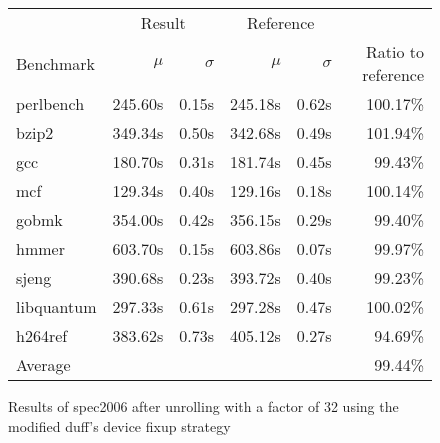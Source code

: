 \begin{figure}[h]
    \begin{center}
        \begin{tabular}{lrrrrr}
            \toprule
            & \multicolumn{2}{c}{Result} & \multicolumn{2}{c}{Reference}\\
            Benchmark & $\mu$ & $\sigma$ & $\mu$ & $\sigma$ & Ratio to reference\\
            \midrule
            perlbench & 245.60s & 0.15s & 245.18s & 0.62s & 100.17\%\\
            bzip2 & 349.34s & 0.50s & 342.68s & 0.49s & 101.94\%\\
            gcc & 180.70s & 0.31s & 181.74s & 0.45s & 99.43\%\\
            mcf & 129.34s & 0.40s & 129.16s & 0.18s & 100.14\%\\
            gobmk & 354.00s & 0.42s & 356.15s & 0.29s & 99.40\%\\
            hmmer & 603.70s & 0.15s & 603.86s & 0.07s & 99.97\%\\
            sjeng & 390.68s & 0.23s & 393.72s & 0.40s & 99.23\%\\
            libquantum & 297.33s & 0.61s & 297.28s & 0.47s & 100.02\%\\
            h264ref & 383.62s & 0.73s & 405.12s & 0.27s & 94.69\%\\
            \midrule
            Average & & & & & 99.44\%\\
            \bottomrule
        \end{tabular}
    \end{center}
    \caption{Results of spec2006 after unrolling with a factor of 32 using the modified duff's device fixup strategy}
    \label{fig:eval:perf:duff:32}
\end{figure}
